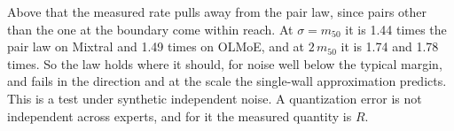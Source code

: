 \documentclass[10pt]{article}
\begin{document}
Above that the measured rate pulls away from the pair law, since pairs other than the one at the
boundary come within reach. At $\sigma = m_{50}$ it is 1.44 times the pair law on Mixtral and
1.49 times on OLMoE, and at $2\,m_{50}$ it is 1.74 and 1.78 times. So the law holds where it
should, for noise well below the typical margin, and fails in the direction and at the scale the
single-wall approximation predicts. This is a test under synthetic independent noise. A
quantization error is not independent across experts, and for it the measured quantity is $R$.
\end{document}
